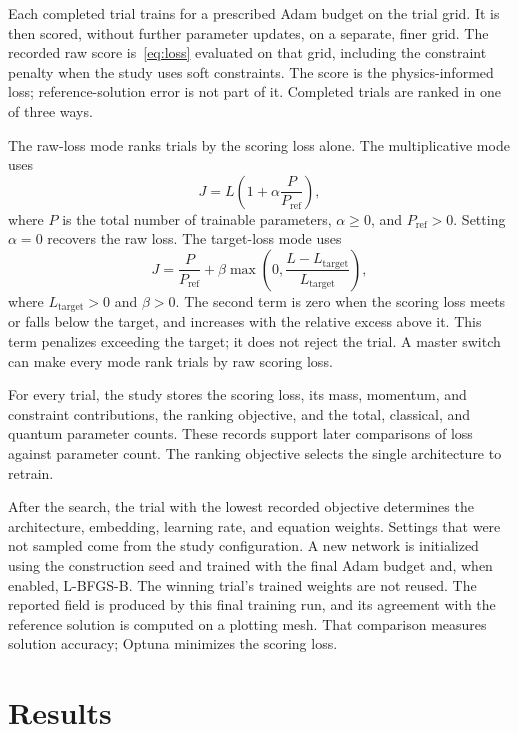 \documentclass{erdc}
\begin{document}
Each completed trial trains for a prescribed Adam budget on the trial
grid. It is then scored, without further parameter updates, on a
separate, finer grid. The recorded raw score is~\eqref{eq:loss}
evaluated on that grid, including the constraint penalty when the study
uses soft constraints. The score is the physics-informed loss;
reference-solution error is not part of it. Completed trials are ranked
in one of three ways.

The raw-loss mode ranks trials by the scoring loss alone. The
multiplicative mode uses
\begin{equation}
\label{eq:jmult}
J=L\left(1+\alpha\frac{P}{P_{\mathrm{ref}}}\right),
\end{equation}
where \(P\) is the total number of trainable parameters,
\(\alpha\ge 0\), and \(P_{\mathrm{ref}}>0\). Setting \(\alpha=0\)
recovers the raw loss. The target-loss mode uses
\begin{equation}
\label{eq:jtarget}
J=\frac{P}{P_{\mathrm{ref}}}
+\beta\max\left(0,\frac{L-L_{\mathrm{target}}}{L_{\mathrm{target}}}\right),
\end{equation}
where \(L_{\mathrm{target}}>0\) and \(\beta>0\). The second term is
zero when the scoring loss meets or falls below the target, and
increases with the relative excess above it. This term penalizes
exceeding the target; it does not reject the trial. A master switch can
make every mode rank trials by raw scoring loss.

For every trial, the study stores the scoring loss, its mass, momentum,
and constraint contributions, the ranking objective, and the total,
classical, and quantum parameter counts. These records support later
comparisons of loss against parameter count. The ranking objective
selects the single architecture to retrain.

After the search, the trial with the lowest recorded objective
determines the architecture, embedding, learning rate, and equation
weights. Settings that were not sampled come from the study
configuration. A new network is initialized using the construction seed
and trained with the final Adam budget and, when enabled, L-BFGS-B.
The winning trial's trained weights are not reused. The reported field
is produced by this final training run, and its agreement with the
reference solution is computed on a plotting mesh. That comparison
measures solution accuracy; Optuna minimizes the scoring loss.

\chapter{Results}
\label{sec:results}
\end{document}
